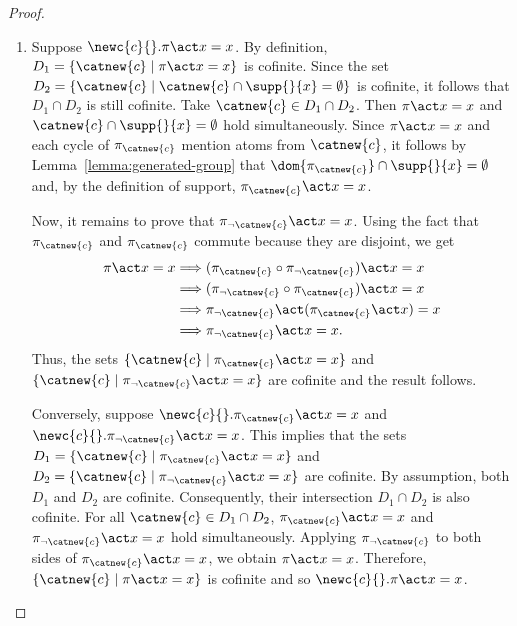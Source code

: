 \pitts*

\begin{proof}
    \begin{enumerate}
        \item Suppose $\newc{c}{}.\pi\act x = x$. By definition, $D_1=\{\catnew{c} \mid \pi\act x  = x\}$ is cofinite. Since the set $D_2 = \{\catnew{c} \mid \catnew{c}\cap\supp{}{x} = \emptyset\}$ is cofinite, it follows that $D_1\cap D_2$ is still cofinite. Take $\catnew{c}\in D_1\cap D_2$. Then $\pi\act x = x$ and $\catnew{c}\cap \supp{}{x} = \emptyset$ hold simultaneously. Since $\pi\act x = x$ and each cycle of $\pi_{\catnew{c}}$ mention atoms from $\catnew{c}$, it follows by Lemma~\ref{lemma:generated-group} that $\dom{\pi_{\catnew{c}}}\cap \supp{}{x} = \emptyset$ and, by the definition of support, $\pi_{\catnew{c}}\act  x = x$.

        Now, it remains to prove that $\pi_{\neg\catnew{c}}\act x = x$. Using the fact that $\pi_{\catnew{c}}$ and $\pi_{\catnew{c}}$ commute because they are disjoint, we get
        \begin{align*}
            \pi\act x = x &\Longrightarrow (\pi_{\catnew{c}}\circ\pi_{\neg\catnew{c}})\act x = x\\
            &\Longrightarrow (\pi_{\neg\catnew{c}}\circ \pi_{\catnew{c}})\act x = x\\
            &\Longrightarrow \pi_{\neg\catnew{c}}\act(\pi_{\catnew{c}}\act x) = x\\
            &\Longrightarrow \pi_{\neg\catnew{c}}\act x = x.
        \end{align*}
        Thus, the sets $\{\catnew{c} \mid \pi_{\catnew{c}}\act x = x\}$ and $\{\catnew{c} \mid \pi_{\neg\catnew{c}}\act  x = x\}$ are cofinite and the result follows.

        Conversely, suppose $\newc{c}{}.\pi_{\catnew{c}}\act x = x$ and $\newc{c}{}.\pi_{\neg\catnew{c}}\act x = x$. This implies that the sets $D_1 = \{\catnew{c} \mid \pi_{\catnew{c}}\act  x = x\}$ and $D_2 = \{\catnew{c} \mid \pi_{\neg\catnew{c}}\act  x = x\}$ are cofinite. By assumption, both $D_1$ and $D_2$ are cofinite. Consequently, their intersection $D_1 \cap D_2$ is also cofinite. For all $\catnew{c} \in D_1 \cap D_2$, $\pi_{\catnew{c}}\act x = x$ and $\pi_{\neg\catnew{c}}\act x = x$ hold simultaneously. Applying $\pi_{\neg\catnew{c}}$ to both sides of $\pi_{\catnew{c}}\act x = x$, we obtain $\pi\act x = x$. Therefore, $\{\catnew{c} \mid \pi\act  x = x\}$ is cofinite and so $\newc{c}{}.\pi\act x = x$.


\end{enumerate}
\end{proof}
